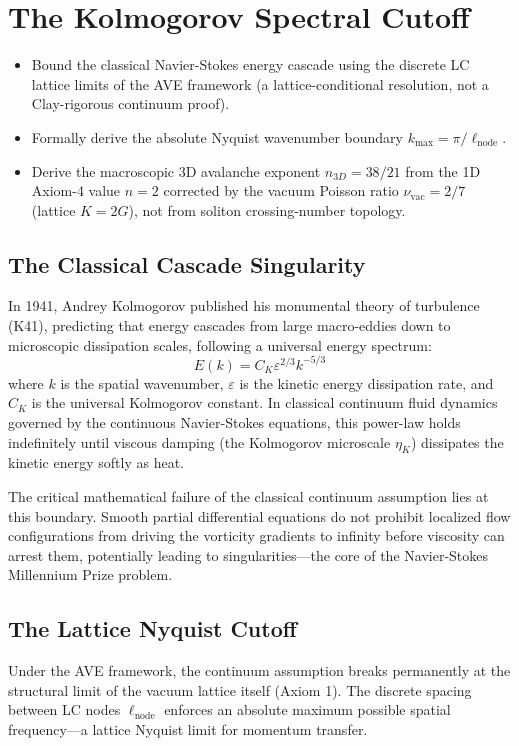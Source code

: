\chapter{The Kolmogorov Spectral Cutoff}
\label{ch:kolmogorov_spectral_cutoff}

\begin{objectivebox}
\begin{itemize}
    \item Bound the classical Navier-Stokes energy cascade using the discrete LC lattice limits of the AVE framework (a lattice-conditional resolution, not a Clay-rigorous continuum proof).
    \item Formally derive the absolute Nyquist wavenumber boundary $k_{\max} = \pi/\ell_{\mathrm{node}}$.
    \item Derive the macroscopic 3D avalanche exponent $n_{3D} = 38/21$ from the 1D Axiom-4 value $n=2$ corrected by the vacuum Poisson ratio $\nu_{\mathrm{vac}}=2/7$ (lattice $K=2G$), not from soliton crossing-number topology.
\end{itemize}
\end{objectivebox}

\section{The Classical Cascade Singularity}
In 1941, Andrey Kolmogorov published his monumental theory of turbulence (K41), predicting that energy cascades from large macro-eddies down to microscopic dissipation scales, following a universal energy spectrum:
\begin{equation}
    E(k) = C_K \varepsilon^{2/3} k^{-5/3}
\end{equation}
where $k$ is the spatial wavenumber, $\varepsilon$ is the kinetic energy dissipation rate, and $C_K$ is the universal Kolmogorov constant. In classical continuum fluid dynamics governed by the continuous Navier-Stokes equations, this power-law holds indefinitely until viscous damping (the Kolmogorov microscale $\eta_K$) dissipates the kinetic energy softly as heat.

The critical mathematical failure of the classical continuum assumption lies at this boundary. Smooth partial differential equations do not prohibit localized flow configurations from driving the vorticity gradients to infinity before viscosity can arrest them, potentially leading to singularities---the core of the Navier-Stokes Millennium Prize problem.

\section{The Lattice Nyquist Cutoff}
Under the AVE framework, the continuum assumption breaks permanently at the structural limit of the vacuum lattice itself (Axiom 1). The discrete spacing between LC nodes $\ell_{\mathrm{node}}$ enforces an absolute maximum possible spatial frequency---a lattice Nyquist limit for momentum transfer.

